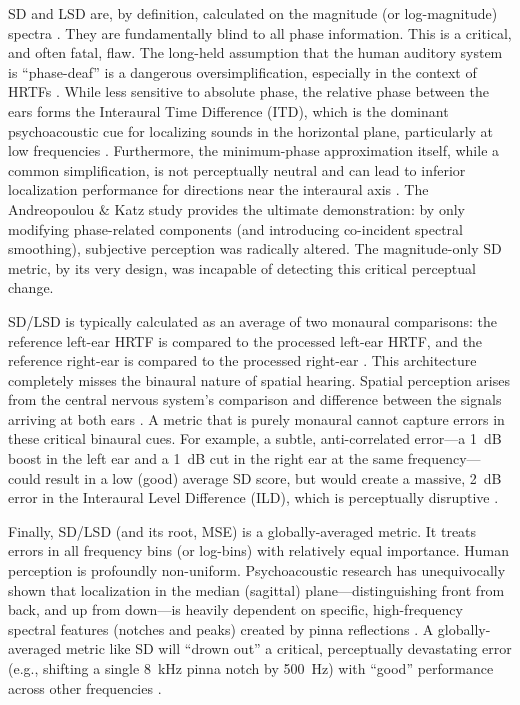\documentclass[12pt,a4paper]{article}
\begin{document}
SD and LSD are, by definition, calculated on the magnitude (or log-magnitude) spectra \cite{hrtf_measure_review2020}. They are fundamentally blind to all phase information. This is a critical, and often fatal, flaw. The long-held assumption that the human auditory system is ``phase-deaf'' is a dangerous oversimplification, especially in the context of HRTFs \cite{blauert1997}. While less sensitive to absolute phase, the relative phase between the ears forms the Interaural Time Difference (ITD), which is the dominant psychoacoustic cue for localizing sounds in the horizontal plane, particularly at low frequencies \cite{audloc2024}. Furthermore, the minimum-phase approximation itself, while a common simplification, is not perceptually neutral and can lead to inferior localization performance for directions near the interaural axis \cite{kulkarni1998}. The Andreopoulou \& Katz study \cite{andreopoulou2022} provides the ultimate demonstration: by only modifying phase-related components (and introducing co-incident spectral smoothing), subjective perception was radically altered. The magnitude-only SD metric, by its very design, was incapable of detecting this critical perceptual change.

SD/LSD is typically calculated as an average of two monaural comparisons: the reference left-ear HRTF is compared to the processed left-ear HRTF, and the reference right-ear is compared to the processed right-ear \cite{hrtf_measure_review2020}. This architecture completely misses the binaural nature of spatial hearing. Spatial perception arises from the central nervous system's comparison and difference between the signals arriving at both ears \cite{audloc2024}. A metric that is purely monaural cannot capture errors in these critical binaural cues. For example, a subtle, anti-correlated error---a 1~dB boost in the left ear and a 1~dB cut in the right ear at the same frequency---could result in a low (good) average SD score, but would create a massive, 2~dB error in the Interaural Level Difference (ILD), which is perceptually disruptive \cite{blauert1997}.

Finally, SD/LSD (and its root, MSE) is a globally-averaged metric. It treats errors in all frequency bins (or log-bins) with relatively equal importance. Human perception is profoundly non-uniform. Psychoacoustic research has unequivocally shown that localization in the median (sagittal) plane---distinguishing front from back, and up from down---is heavily dependent on specific, high-frequency spectral features (notches and peaks) created by pinna reflections \cite{audloc2024}. A globally-averaged metric like SD will ``drown out'' a critical, perceptually devastating error (e.g., shifting a single 8~kHz pinna notch by 500~Hz) with ``good'' performance across other frequencies \cite{andreopoulou_icmc2014}.
\end{document}
